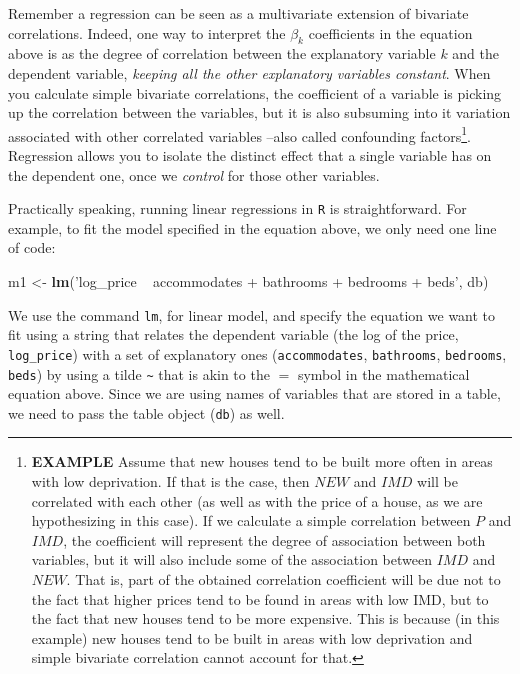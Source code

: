 \documentclass[
]{book}
\newenvironment{Shaded}{\begin{snugshade}}{\end{snugshade}}
\newcommand{\KeywordTok}[1]{\textcolor[rgb]{0.13,0.29,0.53}{\textbf{#1}}}
\newcommand{\NormalTok}[1]{#1}
\newcommand{\StringTok}[1]{\textcolor[rgb]{0.31,0.60,0.02}{#1}}
\begin{document}
Remember a regression can be seen as a multivariate extension of bivariate correlations. Indeed, one way to interpret the \(\beta_k\) coefficients in the equation above is as the degree of correlation between the explanatory variable \(k\) and the dependent variable, \emph{keeping all the other explanatory variables constant}. When you calculate simple bivariate correlations, the coefficient of a variable is picking up the correlation between the variables, but it is also subsuming into it variation associated with other correlated variables --also called confounding factors\footnote{\textbf{EXAMPLE} Assume that new houses tend to be built more often in areas with low deprivation. If that is the case, then \(NEW\) and \(IMD\) will be correlated with each other (as well as with the price of a house, as we are hypothesizing in this case). If we calculate a simple correlation between \(P\) and \(IMD\), the coefficient will represent the degree of association between both variables, but it will also include some of the association between \(IMD\) and \(NEW\). That is, part of the obtained correlation coefficient will be due not to the fact that higher prices tend to be found in areas with low IMD, but to the fact that new houses tend to be more expensive. This is because (in this example) new houses tend to be built in areas with low deprivation and simple bivariate correlation cannot account for that.}. Regression allows you to isolate the distinct effect that a single variable has on the dependent one, once we \emph{control} for those other variables.

Practically speaking, running linear regressions in \texttt{R} is straightforward. For example, to fit the model specified in the equation above, we only need one line of code:

\begin{Shaded}
\begin{Highlighting}[]
\NormalTok{m1 <-}\StringTok{ }\KeywordTok{lm}\NormalTok{(}\StringTok{'log_price ~ accommodates + bathrooms + bedrooms + beds'}\NormalTok{, db)}
\end{Highlighting}
\end{Shaded}

We use the command \texttt{lm}, for linear model, and specify the equation we want to fit using a string that relates the dependent variable (the log of the price, \texttt{log\_price}) with a set of explanatory ones (\texttt{accommodates}, \texttt{bathrooms}, \texttt{bedrooms}, \texttt{beds}) by using a tilde \texttt{\textasciitilde{}} that is akin to the \(=\) symbol in the mathematical equation above. Since we are using names of variables that are stored in a table, we need to pass the table object (\texttt{db}) as well.
\end{document}
